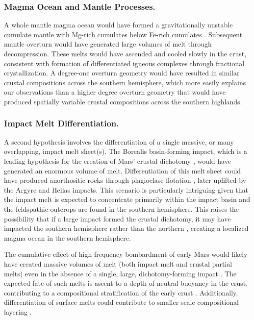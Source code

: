 \documentclass[12pt]{article}
\begin{document}
\subsubsection*{Magma Ocean and Mantle Processes.} 

A whole mantle magma ocean would have formed a gravitationally unstable cumulate mantle with Mg-rich cumulates below Fe-rich cumulates \citep{Elkins-Tanton2005}. Subsequent mantle overturn would have generated large volumes of melt through decompression. These melts would have ascended and cooled slowly in the crust, consistent with formation of differentiated igneous complexes through fractional crystallization. A degree-one overturn geometry \citep{Borg2003, Elkins-Tanton2005, Debaille2008} would have resulted in similar crustal compositions across the southern hemisphere, which more easily explains our observations than a higher degree overturn geometry \citep{Scheinberg2014} that would have produced spatially variable crustal compositions across the southern highlands.

\subsubsection*{Impact Melt Differentiation.} 

A second hypothesis involves the differentiation of a single massive, or many overlapping, impact melt sheet(s). The Borealis basin-forming impact, which is a leading hypothesis for the creation of Mars' crustal dichotomy \citep{Don1984, Andrews-Hanna2008, Marinova2008, Nimmo2008}, would have generated an enormous volume of melt. Differentiation of this melt sheet could have produced anorthositic rocks through plagioclase flotation \citep{Koeppel2020, Manske2021}, later uplifted by the Argyre and Hellas impacts. This scenario is particularly intriguing given that the impact melt is expected to concentrate primarily within the impact basin \citep{Marinova2008, Ballantyne2023} and the feldspathic outcrops are found in the southern hemisphere. This raises the possibility that if a large impact formed the crustal dichotomy, it may have impacted the southern hemisphere rather than the northern \citep{Reese2010, Golabek2011, Leone2014, Ballantyne2023, Cheng2024}, creating a localized magma ocean in the southern hemisphere.

The cumulative effect of high frequency bombardment of early Mars would likely have created massive volumes of melt (both impact melt and crustal partial melts) even in the absence of a single, large, dichotomy-forming impact \citep{Koeppel2020, Manske2021, Black2024}. The expected fate of such melts is ascent to a depth of neutral buoyancy in the crust, contributing to a compositional stratification of the early crust \citep{Black2024}. Additionally, differentiation of surface melts could contribute to smaller scale compositional layering \citep{Koeppel2020}.
\end{document}
